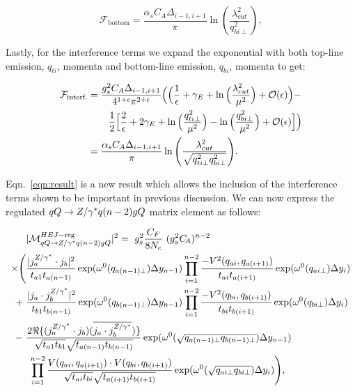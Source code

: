 		\begin{equation}
		\mathcal{F}_{\text{bottom}} = \frac{\alpha_sC_A\Delta_{i-1, i+1}}{\pi}\ln\left(\frac{\lambda_{cut}^2}{q_{bi\perp}^2}\right),
		\end{equation}

		Lastly, for the interference terms we expand the exponential with both top-line emission, $q_{ti}$,
		momenta and bottom-line emission, $q_{bi}$, momenta to get:

		\begin{align}
		\begin{split}
			\mathcal{F}_{\text{interf.}} &= \frac{g_s^2C_A\Delta_{i-1, i+1}}{4^{1+\epsilon}\pi^{2+\epsilon}}
			\Big(\Big(\frac{1}{\epsilon} + \gamma_E +  \ln\Big(\frac{\lambda_{cut}^2}{\mu^2}\Big) +
			\mathcal{O}(\epsilon)\Big) - \\
			&\hspace{0.75cm}\frac{1}{2}\Big[\frac{2}{\epsilon} + 2 \gamma_E +
			\ln\Big(\frac{q_{ti\perp}^2}{\mu^2}\Big)
			- \ln\Big(\frac{q_{bi\perp}^2}{\mu^2}\Big) +
			\mathcal{O}(\epsilon)\Big]\Big) \\
			&= \frac{\alpha_sC_A\Delta_{i-1, i+1}}{\pi}\ln\Bigg(\frac{\lambda_{cut}^2}{\sqrt{q_{ti\perp}^2
			q_{bi\perp}^2}}\Bigg).
			\label{eqn:result}
		\end{split}
		\end{align}

		Eqn.~\eqref{eqn:result} is a new result which allows the inclusion of the interference terms shown
		to be important in previous discussion.  We can now express the regulated $qQ\to Z/\gamma^* q(n-2)gQ$
		matrix element as follows:

		\begin{align}
		  \label{eq:allordereg}
		  \begin{split}
		    &|\mathcal{M}^{HEJ-{\rm reg}}_{qQ\to \zg q(n-2)gQ}|^2 =\ g_s^2 \frac{C_F}{8N_c}\ ( g_s^2
		    \Ca)^{n-2}\  \\  \times \Bigg(& \frac{| j_a^{\zg}\cdot
		      j_b|^2}{t_{a1}t_{a(n-1)}}
		    \exp(\omega^0(q_{a(n-1)\perp})\Delta y_{n-1}) \prod^{n-2}_{i=1} \frac{-V^2(q_{ai},
		      q_{a(i+1)})}{t_{ai} t_{a(i+1)}} \exp(\omega^0(q_{ai\perp})\Delta y_i)\\
		    +\ &\frac{|j_a \cdot j_b^{\zg} |^2}{t_{b1}t_{b(n-1)}} \exp(\omega^0(q_{b(n-1)\perp})\Delta y_{n-1})
		    \prod^{n-2}_{i=1}\frac{-V^2(q_{bi}, q_{b(i+1)})}{t_{bi} t_{b(i+1)}} \exp(\omega^0(q_{bi\perp})\Delta y_i) \\
		    -\ &\frac{2\Re\{ (j_a^{\zg}\cdot j_b)(\overline{j_a \cdot
		        j_b^{\zg}})\}}{\sqrt{t_{a1}t_{b1}}\sqrt{t_{a(n-1)} t_{b(n-1)}}} \exp(\omega^0(\sqrt{q_{a(n-1)\perp}q_{b(n-1)\perp}})\Delta y_{n-1})\\
		    & \; \prod^{n-2}_{i=1}\frac{V(q_{ai}, q_{a(i+1)})\cdot V(q_{bi},
		      q_{b(i+1)})}{\sqrt{t_{ai}t_{bi}} \sqrt{t_{a(i+1)}t_{b(i+1)}}}\exp(\omega^0(\sqrt{q_{ai\perp}q_{bi\perp}})\Delta y_{i})\Bigg),
		  \end{split}
		\end{align}


